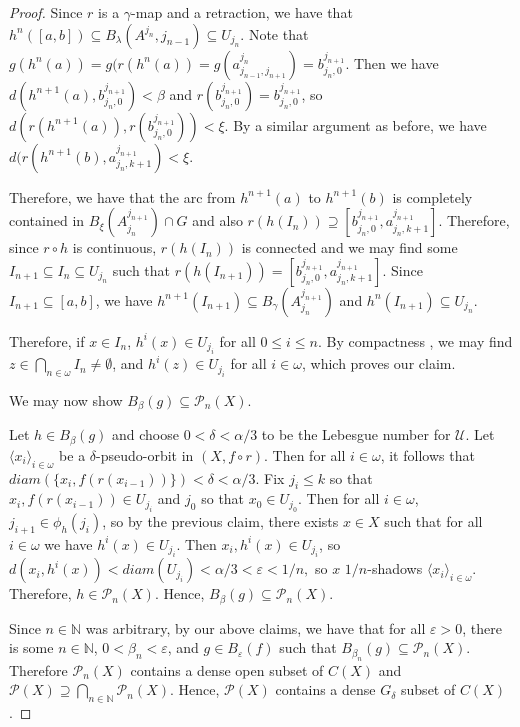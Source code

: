 \documentclass[10pt,a4paper]{amsart}
\numberwithin{equation}{section}
\begin{document}
\begin{proof}
Since $r$ is a $\gamma$-map and a retraction, we have that $h^n([a,b])\subseteq B_\lambda(A^{j_n},{j_{n-1}})\subseteq U_{j_n}$. Note that $g(h^n(a))= g(r(h^n(a))= g(a^{j_n}_{j_{n-1}, j_{n+1}})= b^{j_{n+1}}_{j_{n},0}.$ Then we have $d(h^{n+1}(a), b^{j_{n+1}}_{j_{n},0})<\beta$ and $r(b^{j_{n+1}}_{j_{n},0})=b^{j_{n+1}}_{j_{n},0}$, so $d(r(h^{n+1}(a)),r(b^{j_{n+1}}_{j_{n},0}))<\xi$. By a similar argument as before, we have $d(r(h^{n+1}(b), a^{j_{n+1}}_{j_{n},k+1})<\xi.$ 

Therefore, we have that the arc from $h^{n+1}(a)$ to $h^{n+1}(b)$ is completely contained in $B_\xi (A^{j_{n+1}}_{j_n})\cap G$ and also $r(h(I_n))\supseteq [b^{j_{n+1}}_{j_{n},0},a^{j_{n+1}}_{j_{n},k+1}]$. Therefore, since $r\circ h$ is continuous, $r(h(I_n))$ is connected and we may find some $I_{n+1}\subseteq I_n\subseteq U_{j_n}$ such that $r(h(I_{n+1}))= [b^{j_{n+1}}_{j_{n},0},a^{j_{n+1}}_{j_{n},k+1}]$. Since $I_{n+1}\subseteq[a,b]$, we have $h^{n+1}(I_{n+1})\subseteq B_\gamma(A^{j_{n+1}}_{j_n})$ and $h^n(I_{n+1})\subseteq U_{j_n}.$


Therefore, if $x\in I_n$, $h^i(x)\in U_{j_i}$ for all $0\leq i\leq n$. By compactness , we may find $z\in \bigcap_{n\in \omega}I_n \neq \emptyset$, and $h^i(z)\in U_{j_i} $ for all $i\in \omega$, which proves our claim. 


We may now show $B_\beta(g)\subseteq \mathcal{P}_n(X)$.

Let $h\in B_\beta(g)$ and choose $0<\delta<\alpha/3$ to be the Lebesgue number for $\mathcal{U}$. Let $\langle x_i \rangle _{i\in \omega}$ be a $\delta$-pseudo-orbit in $(X,f\circ r)$. Then for all $i\in \omega$, it follows that $diam(\{x_i, f(r(x_{i-1})) \})<\delta<\alpha/3.$ Fix $j_i\leq k$ so that $x_i,f(r(x_{i-1}))\in U_{j_i}$ and $j_0$ so that $x_0\in U_{j_0}$. Then for all $i \in \omega$, $j_{i+1}\in \phi_h(j_i)$, so by the previous claim, there exists $x\in X$ such that for all $i\in \omega$ we have $h^i(x)\in U_{j_i}.$ Then $x_i,h^i(x)\in U_{j_i}$, so $d(x_i,h^i(x))<diam(U_{j_i})<\alpha/3<\varepsilon<1/n,$ so $x$ $1/n$-shadows $\langle x_i \rangle _{i\in \omega}$. Therefore, $h\in \mathcal{P}_n(X).$ Hence, $B_\beta(g)\subseteq \mathcal{P}_n(X)$.


Since $n\in \mathbb N$ was arbitrary, by our above claims, we have that for all $\varepsilon>0$, there is some $n\in \mathbb N$, $0<\beta_n<\varepsilon$, and $g\in B_\varepsilon(f)$ such that $ B_{\beta_n}(g)\subseteq \mathcal{P}_n(X)$. Therefore $\mathcal{P}_n(X)$ contains a dense open subset of $C(X)$ and $\mathcal{P}(X)\supseteq \bigcap_{n\in \mathbb N}\mathcal{P}_n(X). $ Hence, $\mathcal{P}(X)$ contains a dense $G_\delta$ subset of $C(X)$.



\end{proof}
\end{document}
